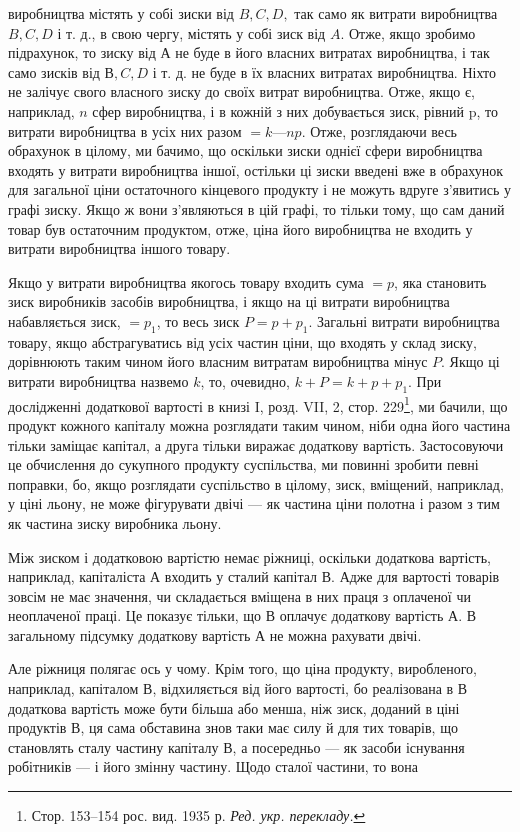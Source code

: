 \parcont{}  %
виробництва містять у собі зиски від $B, C, D,$ так само як витрати виробництва $B, C, D$ і т. д., в
свою чергу, містять у собі
зиск від $A$. Отже, якщо зробимо підрахунок, то зиску від $А$ не
буде в його власних витратах виробництва, і так само зисків
від $В, C, D$ і т. д. не буде в їх власних витратах виробництва.
Ніхто не залічує свого власного зиску до своїх витрат виробництва. Отже, якщо є, наприклад, $n$ сфер
виробництва, і в кожній з них добувається зиск, рівний p, то витрати виробництва в усіх них разом
$= k — np$. Отже, розглядаючи весь обрахунок
в цілому, ми бачимо, що оскільки зиски однієї сфери виробництва входять у витрати виробництва іншої,
остільки ці зиски
введені вже в обрахунок для загальної ціни остаточного кінцевого
продукту і не можуть вдруге з’явитись у графі зиску. Якщо ж
вони з’являються в цій графі, то тільки тому, що сам даний
товар був остаточним продуктом, отже, ціна його виробництва
не входить у витрати виробництва іншого товару.

Якщо у витрати виробництва якогось товару входить сума $= p$, яка становить зиск виробників засобів
виробництва, і якщо
на ці витрати виробництва набавляється зиск, $= p_1$, то весь зиск
$P = p + p_1$. Загальні витрати виробництва товару, якщо абстрагуватись від усіх частин ціни, що
входять у склад зиску, дорівнюють таким чином його власним витратам виробництва мінус $P$.
Якщо ці витрати виробництва назвемо $k$, то, очевидно, $k + P = k + p + p_1$. При дослідженні додаткової
вартості в книзі I,
розд. VII, 2, стор. 229\footnote*{Стор. 153--154 рос. вид. 1935 р. \emph{Ред. укр. перекладу.}}, ми бачили, що продукт кожного капіталу можна розглядати таким чином, ніби
одна його частина
тільки заміщає капітал, а друга тільки виражає додаткову вартість. Застосовуючи це обчислення до
сукупного продукту
суспільства, ми повинні зробити певні поправки, бо, якщо
розглядати суспільство в цілому, зиск, вміщений, наприклад,
у ціні льону, не може фігурувати двічі — як частина ціни полотна
і разом з тим як частина зиску виробника льону.

Між зиском і додатковою вартістю немає ріжниці, оскільки
додаткова вартість, наприклад, капіталіста $А$ входить у сталий
капітал $В$. Адже для вартості товарів зовсім не має значення, чи
складається вміщена в них праця з оплаченої чи неоплаченої праці.
Це показує тільки, що $В$ оплачує додаткову вартість $А$. В загальному підсумку додаткову вартість $А$ не
можна рахувати двічі.

Але ріжниця полягає ось у чому. Крім того, що ціна продукту,
виробленого, наприклад, капіталом $В$, відхиляється від його вартості, бо реалізована в $В$ додаткова
вартість може бути більша
або менша, ніж зиск, доданий в ціні продуктів $В$, ця сама обставина
знов таки має силу й для тих товарів, що становлять сталу
частину капіталу $В$, а посередньо — як засоби існування робітників — і його змінну частину. Щодо
сталої частини, то вона
\parbreak{}  %
